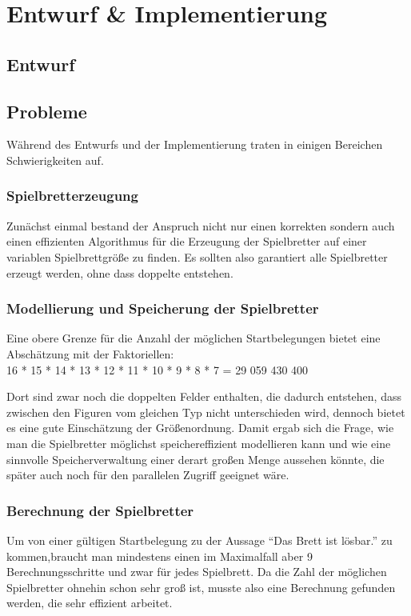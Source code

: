 \documentclass[
	12pt,
	a4paper,
	BCOR10mm,
	DIV14,
	listof=totoc,
	bibliography=totoc,
	headsepline
]{scrreprt}
\begin{document}
\chapter{Entwurf \& Implementierung}
\label{Entwurf}

\section{Entwurf}
\section{Probleme}
Während des Entwurfs und der Implementierung traten in einigen Bereichen Schwierigkeiten auf.
\subsection{Spielbretterzeugung}
Zunächst einmal bestand der Anspruch nicht nur einen korrekten sondern auch einen effizienten Algorithmus für die Erzeugung der Spielbretter auf einer variablen Spielbrettgröße zu finden.
Es sollten also garantiert alle Spielbretter erzeugt werden, ohne dass doppelte entstehen.

\subsection{Modellierung und Speicherung der Spielbretter}
Eine obere Grenze für die Anzahl der möglichen Startbelegungen bietet eine Abschätzung mit der Faktoriellen:\\
16 * 15 * 14 * 13 * 12 * 11 * 10 * 9 * 8 * 7 = 29 059 430 400

Dort sind zwar noch die doppelten Felder enthalten, die dadurch entstehen, dass zwischen den Figuren vom gleichen Typ nicht unterschieden wird, dennoch bietet es eine gute Einschätzung der Größenordnung.
Damit ergab sich die Frage, wie man die Spielbretter möglichst speichereffizient modellieren kann und wie eine sinnvolle Speicherverwaltung einer derart großen Menge aussehen könnte, die später auch noch für den parallelen Zugriff geeignet wäre.

\subsection{Berechnung der Spielbretter}
Um von einer gültigen Startbelegung zu der Aussage  "`Das Brett ist lösbar."' zu kommen,braucht man mindestens einen im Maximalfall aber 9 Berechnungsschritte und zwar für jedes Spielbrett. Da die Zahl der möglichen Spielbretter ohnehin schon sehr groß ist, musste also eine Berechnung gefunden werden, die sehr effizient arbeitet.
\end{document}
